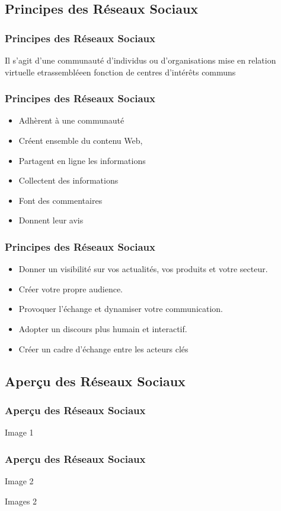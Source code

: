 \documentclass{beamer}
\begin{document}
\subsection{Principes des Réseaux Sociaux}
\begin{frame}
\frametitle{Principes des Réseaux Sociaux}
 Il s’agit d’une communauté d’individus ou d’organisations mise en relation virtuelle etrassembléeen fonction de centres d’intérêts communs
\end{frame}
\begin{frame}
\frametitle{Principes des Réseaux Sociaux}
\begin{itemize}
\item Adhèrent à une communauté 
\item Créent ensemble du contenu Web, 
\item Partagent en ligne les informations
\item Collectent des informations
\item Font des commentaires
\item Donnent leur avis
\end{itemize}
\end{frame}
\begin{frame}
\frametitle{Principes des Réseaux Sociaux}
\begin{itemize}
\item Donner un visibilité sur vos actualités, vos produits et votre secteur.
\item Créer votre propre audience.
\item Provoquer l’échange et dynamiser votre communication.
\item Adopter un discours plus humain et interactif.
\item Créer un cadre d’échange entre les acteurs clés
\end{itemize}
\end{frame}

\subsection{Aperçu des Réseaux Sociaux}
\begin{frame}
\frametitle{Aperçu des Réseaux Sociaux}
Image 1
\end{frame}
\begin{frame}
\frametitle{Aperçu des Réseaux Sociaux}
Image 2
\end{frame}
\begin{frame}
Images 2
\end{frame}
\end{document}
